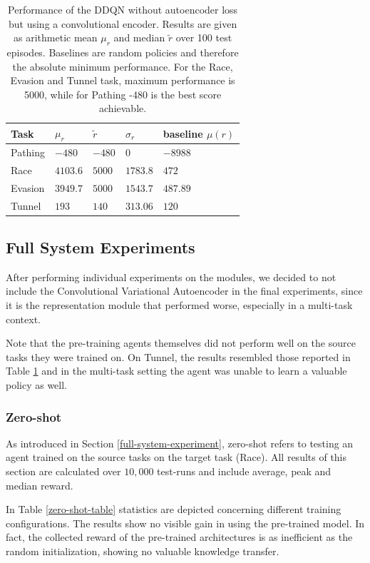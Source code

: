 \begin{table}[t!]
\centering
\begin{tabular}{@{}lllll@{}}
\toprule
\textbf{Task} & \textbf{$\mu_r$} & \textbf{$\widetilde{r}$} & \textbf{$\sigma_r$} & \textbf{baseline} \textbf{$\mu(r)$} \\ \midrule
Pathing & $-480$ & $-480$ & $0$ & $-8988$ \\
Race & $4103.6$ & $5000$ & $1783.8$ & $472$ \\
Evasion & $3949.7$ & $5000$ & $1543.7$ & $487.89$ \\
Tunnel & $193$ & $140$ & $313.06$ & $120$\\ 
\bottomrule
\end{tabular}
\caption{Performance of the DDQN without autoencoder loss but using a convolutional encoder. Results are given as arithmetic mean $\mu_r$ and median $\widetilde{r}$ over 100 test episodes. Baselines are random policies and therefore the absolute minimum performance. For the Race, Evasion and Tunnel task, maximum performance is 5000, while for Pathing -480 is the best score achievable.}
\label{tab:isolated_policy_learner}
\end{table}

\subsection{Full System Experiments}
After performing individual experiments on the modules, we decided to not include the Convolutional Variational Autoencoder in the final experiments, since it is the representation module that performed worse, especially in a multi-task context.

Note that the pre-training agents themselves did not perform well on the source tasks they were trained on. On Tunnel, the results resembled those reported in Table \ref{tab:isolated_policy_learner} and in the multi-task setting the agent was unable to learn a valuable policy as well.

\subsubsection{Zero-shot}
As introduced in Section \ref{full-system-experiment}, zero-shot refers to testing an agent trained on the source tasks on the target task (Race). All results of this section are calculated over $10,000$ test-runs and include average, peak and median reward.

In Table \ref{zero-shot-table} statistics are depicted concerning different training configurations.
The results show no visible gain in using the pre-trained model. In fact, the collected reward of the pre-trained architectures is as inefficient as the random initialization, showing no valuable knowledge transfer.

